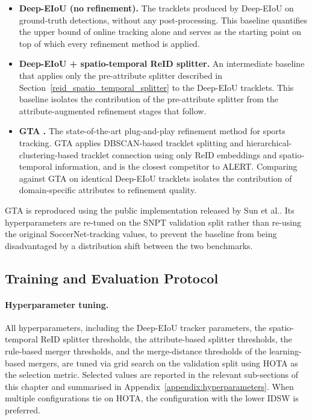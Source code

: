 \begin{itemize}
    \item \textbf{Deep-EIoU (no refinement).} The tracklets produced by Deep-EIoU \cite{deep-eiou} on ground-truth detections, without any post-processing. This baseline quantifies the upper bound of online tracking alone and serves as the starting point on top of which every refinement method is applied.

    \item \textbf{Deep-EIoU + spatio-temporal ReID splitter.} An intermediate baseline that applies only the pre-attribute splitter described in Section~\ref{reid_spatio_temporal_splitter} to the Deep-EIoU tracklets. This baseline isolates the contribution of the pre-attribute splitter from the attribute-augmented refinement stages that follow.

    \item \textbf{GTA \cite{gta}.} The state-of-the-art plug-and-play refinement method for sports tracking. GTA applies DBSCAN-based tracklet splitting and hierarchical-clustering-based tracklet connection using only ReID embeddings and spatio-temporal information, and is the closest competitor to ALERT. Comparing against GTA on identical Deep-EIoU tracklets isolates the contribution of domain-specific attributes to refinement quality.
\end{itemize}

GTA is reproduced using the public implementation released by Sun et al.\cite{gta}. Its hyperparameters are re-tuned on the SNPT validation split rather than re-using the original SoccerNet-tracking values, to prevent the baseline from being disadvantaged by a distribution shift between the two benchmarks.

\subsection{Training and Evaluation Protocol}\label{subsec:protocol}

\paragraph{Hyperparameter tuning.} All hyperparameters, including the Deep-EIoU tracker parameters, the spatio-temporal ReID splitter thresholds, the attribute-based splitter thresholds, the rule-based merger thresholds, and the merge-distance thresholds of the learning-based mergers, are tuned via grid search on the validation split using HOTA as the selection metric. Selected values are reported in the relevant sub-sections of this chapter and summarised in Appendix~\ref{appendix:hyperparameters}. When multiple configurations tie on HOTA, the configuration with the lower IDSW is preferred.


